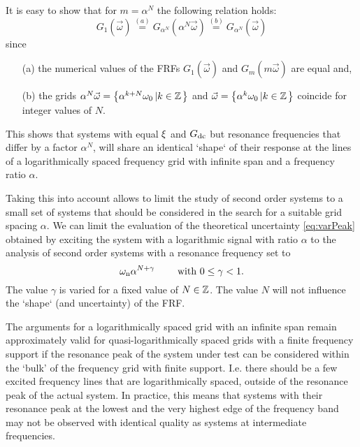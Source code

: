   It is easy to show that for $m = \alpha^N$ the following relation holds:
  \begin{equation}
    G_1\left( \vec{\omega} \right)
    \stackrel{(a)}{=} G_{\alpha^N} \left( \alpha^N \vec{\omega} \right)
    \stackrel{(b)}{=} G_{\alpha^N} \left( \vec{\omega} \right)
    \label{eq:gridPeriodicity}
  \end{equation}
  since
  \begin{itemize}
   \item[(a)] the numerical values of the FRFs $G_1(\vec{\omega})$ and $G_m(m\vec{\omega})$ are equal and,
   \item[(b)] the grids $\alpha^N \vec{\omega} = \left\{\alpha^{k+N} \omega_0 \left| k \in \mathbb{Z} \right.\right\}$ and $\vec{\omega} = \left\{\alpha^k \omega_0 \left| k \in \mathbb{Z} \right.\right\}$ coincide for integer values of $N$.
  \end{itemize}

  This shows that systems with equal $\xi$ and $G_{\mathrm{dc}}$ but resonance frequencies that differ by a factor $\alpha^N$, will share an identical `shape` of their response at the lines of a logarithmically spaced frequency grid with infinite span and a frequency ratio $\alpha$.

  Taking this into account allows to limit the study of second order systems to a small set of systems that should be considered in the search for a suitable grid spacing $\alpha$.
  We can limit the evaluation of the theoretical uncertainty \eqref{eq:varPeak} obtained by exciting the system with a logarithmic signal with ratio $\alpha$ to the analysis of second order systems with a resonance frequency set to
  \begin{equation}
    \omega_{\mathrm{n}} \alpha^{N+\gamma}\qquad \text{ with } 0 \leq \gamma < 1\text{.}
    \label{eq:theoreticalBestVariationOmega}
  \end{equation}
  The value $\gamma$ is varied for a fixed value of $N \in \mathbb{Z}$.
  The value $N$ will not influence the `shape` (and uncertainty) of the FRF.

  The arguments for a logarithmically spaced grid with an infinite span remain approximately valid for quasi-logarithmically spaced grids with a finite frequency support if the resonance peak of the system under test can be considered within the `bulk' of the frequency grid with finite support.
  I.e. there should be a few excited frequency lines that are logarithmically spaced, outside of the resonance peak of the actual system.
  In practice, this means that systems with their resonance peak at the lowest and the very highest edge of the frequency band may not be observed with identical quality as systems at intermediate frequencies.

